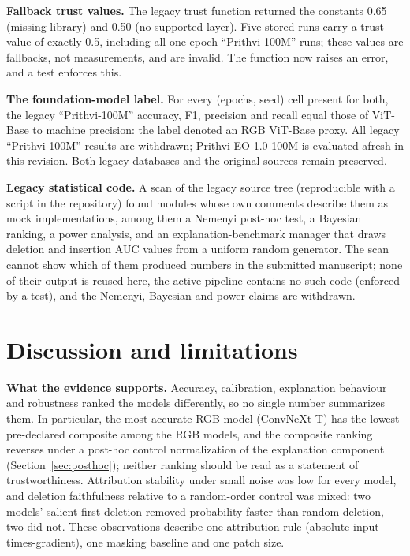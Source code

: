 \documentclass[3p,times,procedia]{elsarticle}
\begin{document}
\textbf{Fallback trust values.} The legacy trust function returned the constants 0.65 (missing library) and 0.50 (no supported layer). Five stored runs carry a trust value of exactly 0.5, including all one-epoch ``Prithvi-100M'' runs; these values are fallbacks, not measurements, and are invalid. The function now raises an error, and a test enforces this.

\textbf{The foundation-model label.} For every (epochs, seed) cell present for both, the legacy ``Prithvi-100M'' accuracy, F1, precision and recall equal those of ViT-Base to machine precision: the label denoted an RGB ViT-Base proxy. All legacy ``Prithvi-100M'' results are withdrawn; Prithvi-EO-1.0-100M is evaluated afresh in this revision. Both legacy databases and the original sources remain preserved.

\textbf{Legacy statistical code.} A scan of the legacy source tree (reproducible with a script in the repository) found modules whose own comments describe them as mock implementations, among them a Nemenyi post-hoc test, a Bayesian ranking, a power analysis, and an explanation-benchmark manager that draws deletion and insertion AUC values from a uniform random generator. The scan cannot show which of them produced numbers in the submitted manuscript; none of their output is reused here, the active pipeline contains no such code (enforced by a test), and the Nemenyi, Bayesian and power claims are withdrawn.

\section{Discussion and limitations}\label{sec:limitations}
\textbf{What the evidence supports.} Accuracy, calibration, explanation behaviour and robustness ranked the models differently, so no single number summarizes them. In particular, the most accurate RGB model (ConvNeXt-T) has the lowest pre-declared composite among the RGB models, and the composite ranking reverses under a post-hoc control normalization of the explanation component (Section~\ref{sec:posthoc}); neither ranking should be read as a statement of trustworthiness. Attribution stability under small noise was low for every model, and deletion faithfulness relative to a random-order control was mixed: two models' salient-first deletion removed probability faster than random deletion, two did not. These observations describe one attribution rule (absolute input-times-gradient), one masking baseline and one patch size.
\end{document}
